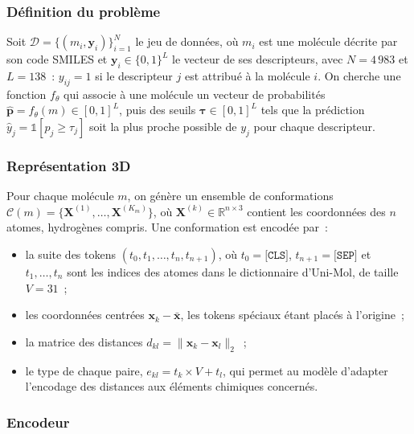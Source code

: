 \subsubsection{Définition du problème}

Soit $\mathcal{D} = \{(m_i, \mathbf{y}_i)\}_{i=1}^{N}$ le jeu de données, où $m_i$ est une molécule décrite par son code SMILES et $\mathbf{y}_i \in \{0, 1\}^{L}$ le vecteur de ses descripteurs, avec $N = 4\,983$ et $L = 138$~: $y_{ij} = 1$ si le descripteur $j$ est attribué à la molécule $i$.
On cherche une fonction $f_\theta$ qui associe à une molécule un vecteur de probabilités $\hat{\mathbf{p}} = f_\theta(m) \in [0, 1]^{L}$, puis des seuils $\boldsymbol{\tau} \in [0, 1]^{L}$ tels que la prédiction $\hat{y}_j = \mathbb{1}[\hat{p}_j \geq \tau_j]$ soit la plus proche possible de $y_j$ pour chaque descripteur.

\subsubsection{Représentation 3D}

Pour chaque molécule $m$, on génère un ensemble de conformations $\mathcal{C}(m) = \{\mathbf{X}^{(1)}, \ldots, \mathbf{X}^{(K_m)}\}$, où $\mathbf{X}^{(k)} \in \mathbb{R}^{n \times 3}$ contient les coordonnées des $n$ atomes, hydrogènes compris.
Une conformation est encodée par~:
\begin{itemize}
   \item la suite des tokens $(t_0, t_1, \ldots, t_n, t_{n+1})$, où $t_0 = \texttt{[CLS]}$, $t_{n+1} = \texttt{[SEP]}$ et $t_1, \ldots, t_n$ sont les indices des atomes dans le dictionnaire d'Uni-Mol, de taille $V = 31$~;
   \item les coordonnées centrées $\mathbf{x}_k - \bar{\mathbf{x}}$, les tokens spéciaux étant placés à l'origine~;
   \item la matrice des distances $d_{kl} = \lVert \mathbf{x}_k - \mathbf{x}_l \rVert_2$~;
   \item le type de chaque paire, $e_{kl} = t_k \times V + t_l$, qui permet au modèle d'adapter l'encodage des distances aux éléments chimiques concernés.
\end{itemize}

\subsubsection{Encodeur}


